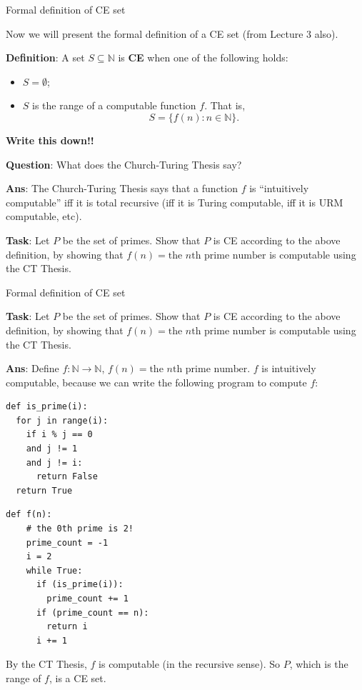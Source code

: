 \documentclass{beamer}
\newcommand{\N}{\mathbb N}
\begin{document}
\begin{frame}{Formal definition of CE set}

Now we will present the formal definition of a CE set (from Lecture 3 also).

\textbf{Definition}: A set $S \subseteq \N$ is \textbf{CE} when one of the following holds:
\begin{itemize}
    \item $S = \emptyset$;
    \item $S$ is the range of a computable function $f$. That is,
    $$S = \{f(n): n \in \N\}.$$
\end{itemize}

\textbf{Write this down!!}

\pause

\textbf{Question}: What does the Church-Turing Thesis say?

\pause

\textbf{Ans}: The Church-Turing Thesis says that a function $f$ is ``intuitively computable'' iff it is total recursive (iff it is Turing computable, iff it is URM computable, etc).

\pause

\textbf{Task}: Let $P$ be the set of primes. Show that $P$ is CE according to the above definition, by showing that $f(n) = \text{the $n$th prime number}$ is computable using the CT Thesis.

\end{frame}

\begin{frame}[fragile]{Formal definition of CE set}

\textbf{Task}: Let $P$ be the set of primes. Show that $P$ is CE according to the above definition, by showing that $f(n) = \text{the $n$th prime number}$ is computable using the CT Thesis.

\vspace{2mm}

\textbf{Ans}: Define $f: \N \to \N$, $f(n) = \text{the $n$th prime number}$. $f$ is intuitively computable, because we can write the following program to compute $f$:

\begin{minipage}{0.36\textwidth}
\begin{verbatim}
def is_prime(i):
  for j in range(i):
    if i % j == 0
    and j != 1
    and j != i:
      return False
  return True
\end{verbatim}
\end{minipage}
\begin{minipage}{0.36\textwidth}
\begin{verbatim}
def f(n):
    # the 0th prime is 2!
    prime_count = -1
    i = 2
    while True:
      if (is_prime(i)):
        prime_count += 1
      if (prime_count == n):
        return i
      i += 1
\end{verbatim}
\end{minipage}

By the CT Thesis, $f$ is computable (in the recursive sense). So $P$, which is the range of $f$, is a CE set.

\end{frame}
\end{document}
